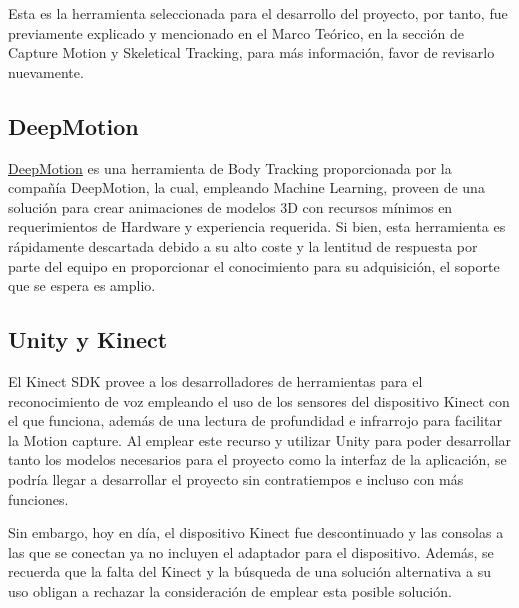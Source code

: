Esta es la herramienta seleccionada para el desarrollo del proyecto, por tanto, fue previamente explicado y mencionado en el Marco Teórico, en la sección de Capture Motion y Skeletical Tracking, para más información, favor de revisarlo nuevamente.



\subsection{DeepMotion}
\href{https://deepmotion.com/3d-body-tracking}{DeepMotion} es una herramienta de Body Tracking proporcionada por la compañía DeepMotion, la cual, empleando Machine Learning, proveen de una solución para crear animaciones de modelos 3D con recursos mínimos en requerimientos de Hardware y experiencia requerida. Si bien, esta herramienta es rápidamente descartada debido a su alto coste y la lentitud de respuesta por parte del equipo en proporcionar el conocimiento para su adquisición, el soporte que se espera es amplio.

\subsection{Unity y Kinect}

El Kinect SDK provee a los desarrolladores de herramientas para el reconocimiento de voz empleando el uso de los sensores del dispositivo Kinect con el que funciona, además de una lectura de profundidad e infrarrojo para facilitar la Motion capture. Al emplear este recurso y utilizar Unity para poder desarrollar tanto los modelos necesarios para el proyecto como la interfaz de la aplicación, se podría llegar a desarrollar el proyecto sin contratiempos e incluso con más funciones.

Sin embargo, hoy en día, el dispositivo Kinect fue descontinuado y las consolas a las que se conectan ya no incluyen el adaptador para el dispositivo. Además, se recuerda que la falta del Kinect y la búsqueda de una solución alternativa a su uso obligan a rechazar la consideración de emplear esta posible solución.










